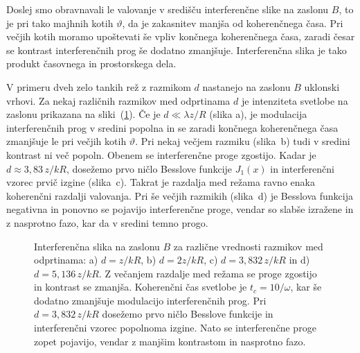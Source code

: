 Doslej smo obravnavali le valovanje v središču interferenčne slike na
zaslonu $B$, to je pri tako majhnih kotih $\vartheta$, da je zakasnitev
manjša od koherenčnega časa. Pri večjih kotih moramo upoštevati še
vpliv končnega koherenčnega časa, zaradi česar se kontrast interferenčnih
prog še dodatno zmanjšuje. Interferenčna slika je 
tako produkt časovnega in prostorskega dela. 

V primeru dveh zelo tankih rež z razmikom $d$ nastanejo na zaslonu
$B$ uklonski vrhovi. Za nekaj različnih razmikov med odprtinama $d$ je intenziteta
svetlobe na zaslonu prikazana na sliki~(\ref{fig:Interferencna-slika}).
Če je $d\ll\lambda z/R$ (slika a), je modulacija interferenčnih prog v sredini
popolna in se zaradi končnega koherenčnega časa zmanjšuje le pri večjih
kotih $\vartheta$. Pri nekaj večjem razmiku (slika~b) tudi v sredini kontrast
ni več popoln. Obenem se interferenčne proge zgostijo. Kadar je $d\approx 3,83\,z/kR$,
dosežemo prvo ničlo Besslove funkcije $J_{1}(x)$ in interferenčni vzorec
prvič izgine (slika~c). Takrat je razdalja med režama ravno enaka 
koherenčni razdalji valovanja. Pri še večjih razmikih (slika~d) 
je Besslova funkcija negativna in ponovno se pojavijo interferenčne proge, 
vendar so slabše izražene in z nasprotno fazo, kar da v sredini temno progo. 

\begin{figure}[h]
\begin{center}
\def\svgwidth{0.45\textwidth} 

\def\svgwidth{0.45\textwidth} 

\def\svgwidth{0.45\textwidth} 

\def\svgwidth{0.45\textwidth} 

\caption{Interferenčna slika na zaslonu
$B$ za različne vrednosti razmikov med odprtinama: a) $d = z/kR$, b) $d=2z/kR$, 
c) $d = 3,832\,z/kR$ in d) $d = 5,136\,z/kR$. 
Z večanjem razdalje med režama se proge zgostijo in kontrast se zmanjša. Koherenčni
čas svetlobe je $t_{c}=10/\omega$, kar še dodatno zmanjšuje modulacijo
interferenčnih prog. Pri $d=3,832\,z/kR$ dosežemo prvo ničlo Besslove
funkcije in interferenčni vzorec popolnoma izgine. Nato se interferenčne
proge zopet pojavijo, vendar z manjšim kontrastom in nasprotno fazo.}
\label{fig:Interferencna-slika}
\end{center}
\end{figure}

